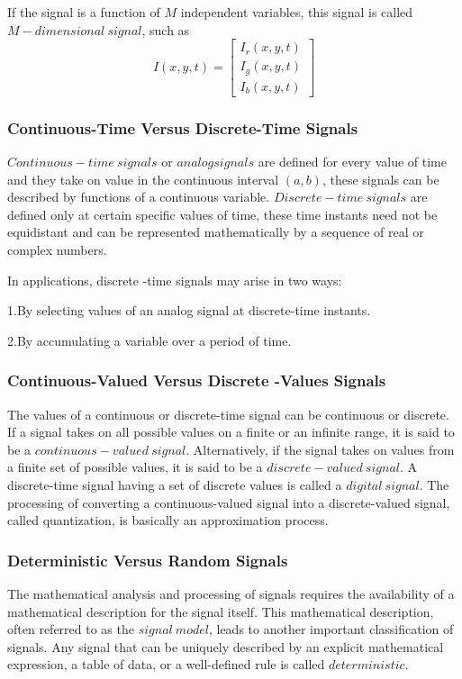 \documentclass[10pt,a4paper,oneside]{article}
\begin{document}
If the signal is a function of $M$ independent variables, this signal is called $M-dimensional\  signal$, such as
\[
I(x,y,t)=\begin{bmatrix}
I_r(x,y,t)\\I_g(x,y,t)\\I_b(x,y,t)
\end{bmatrix}
\]
\subsubsection{Continuous-Time Versus Discrete-Time Signals}
$Continuous-time \ signals$ or $analog signals$ are defined for every value of time and they take on value in the continuous interval $(a, b)$, these signals can be described by functions of a continuous variable. $Discrete-time\  signals$ are defined only at certain specific values of time, these time instants need not be equidistant and can be represented mathematically by a sequence of real or complex numbers.

In applications, discrete -time signals may arise in two ways:

1.By selecting values of an analog signal at discrete-time instants.

2.By accumulating a variable over a period of time.

\subsubsection{Continuous-Valued Versus Discrete -Values Signals}
The values of a continuous or discrete-time signal can be continuous or discrete.  If a signal takes on all possible values on a finite or an infinite range, it is said to be a $continuous -valued\  signal$. Alternatively, if the signal takes on values from a finite set of possible values, it is said to be a $discrete-valued\ signal$. A discrete-time signal having a set of discrete values is called a $digital\ signal$. The processing of converting a continuous-valued signal into a discrete-valued signal, called quantization, is basically an approximation process.
\subsubsection{Deterministic Versus Random Signals}
The mathematical analysis and processing of signals requires the availability of a mathematical description for the signal itself. This mathematical description, often referred to as the $signal \ model$, leads to another important classification of signals. Any signal that can be uniquely described by an explicit mathematical expression, a table of data, or a well-defined rule is called $deterministic$.
\end{document}
